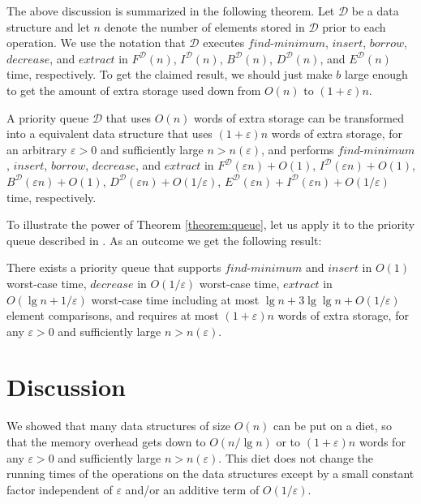 \documentclass{DIKU-article}
\newcommand{\Findmin}{\mbox{$\mathit{find}$\textnormal{-}}\allowbreak{}\mbox{$\mathit{minimum}$}}
\newcommand{\Insert}{\mbox{$\mathit{insert}$}}
\newcommand{\Extract}{\mbox{$\mathit{extract}$}}
\newcommand{\Decrease}{\mbox{$\mathit{decrease}$}}
\newcommand{\Borrow}{\mbox{$\mathit{borrow}$}}
\newcommand{\seclabel}[1]{\label{sec:#1}}
\begin{document}
The above discussion is summarized in the following theorem.  Let
$\mathcal{D}$ be a data structure and let $n$ denote the number of
elements stored in $\mathcal{D}$ prior to each operation.  We use the
notation that $\mathcal{D}$ executes \Findmin{}, \Insert{},
\Borrow{}, \Decrease{}, and \Extract{} in 
$F^{\mathcal{D}}(n)$,
$I^{\mathcal{D}}(n)$, 
$B^{\mathcal{D}}(n)$, 
$D^{\mathcal{D}}(n)$, and
$E^{\mathcal{D}}(n)$ time, respectively. To get the claimed result, we
should just make $b$ large enough to get the amount of extra storage
used down from $O(n)$ to $(1+\varepsilon)n$.

\begin{theorem}
\label{theorem:queue}
A priority queue $\mathcal{D}$ that uses $O(n)$ words of extra storage
can be transformed into a equivalent data structure that
uses
$(1+\varepsilon)n$ words of extra storage, for an arbitrary
$\varepsilon > 0$ and sufficiently large $n > n(\varepsilon)$, and performs 
\Findmin{}, \Insert{},
\Borrow{}, \Decrease{}, and \Extract{} in
$F^{\mathcal{D}}(\varepsilon n) + O(1)$,
$I^{\mathcal{D}}(\varepsilon n) + O(1)$,
$B^{\mathcal{D}}(\varepsilon n) + O(1)$,
$D^{\mathcal{D}}(\varepsilon n) + O(1/\varepsilon)$,
$E^{\mathcal{D}}(\varepsilon n) + I^{\mathcal{D}}(\varepsilon n) + O(1/\varepsilon)$ time, respectively.
\end{theorem}

To illustrate the power of Theorem \ref{theorem:queue}, let us apply
it to the priority queue described in \cite{EJK06}. As an outcome we
get the following result:

\begin{corollary}
\label{corollary:queue}
There exists a priority queue that supports \Findmin{} and \Insert{}
in $O(1)$ worst-case time, \Decrease{} in $O(1/\varepsilon)$
worst-case time, \Extract{} in $O(\lg n + 1/\varepsilon)$ worst-case
time including at most $\lg n + 3\lg\lg n + O(1/\varepsilon)$ element
comparisons, and requires at most $(1 + \varepsilon)n$ words of extra
storage, for any $\varepsilon > 0$ and sufficiently large $n > n(\varepsilon)$.
\end{corollary}

\section{Discussion}\seclabel{discussion}

We showed that many data structures of size $O(n)$ can be put on a
diet, so that the memory overhead gets down to $O(n/\lg n)$ or to $(1
+ \varepsilon)n$ words for any $\varepsilon >0$ and sufficiently large
$n > n(\varepsilon)$. This diet does not change the running times of
the operations on the data structures except by a small constant
factor independent of $\varepsilon$ and/or an additive term of
$O(1/\varepsilon)$.
\end{document}
